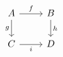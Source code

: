 %

\[
    \begin{tikzcd}
        A \arrow[r, "f"] \arrow[d, "g"'] & B \arrow[d, "h"] \\
        C \arrow[r, "i"'] & D
    \end{tikzcd}
\]